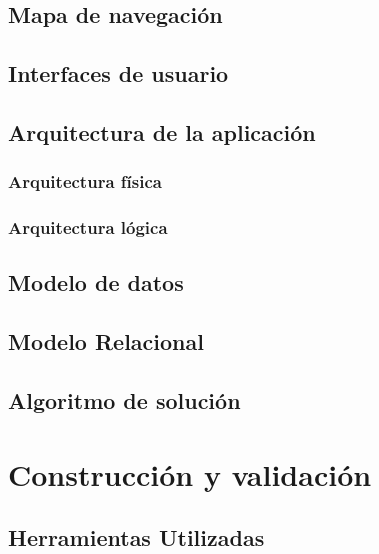 \documentclass{iccmemoria}
\begin{document}
	\section{Mapa de navegación}
	

	\section{Interfaces de usuario}
	

	\section{Arquitectura de la aplicación}
	

		\subsection{Arquitectura física}
		

		\subsection{Arquitectura lógica}
		\label{sec:Arquitectura_Logica}
		

	\section{Modelo de datos}
	

	\section{Modelo Relacional}
	

	\section{Algoritmo de solución}
	

\chapter{Construcción y validación}


	\section{Herramientas Utilizadas}
	
\end{document}
